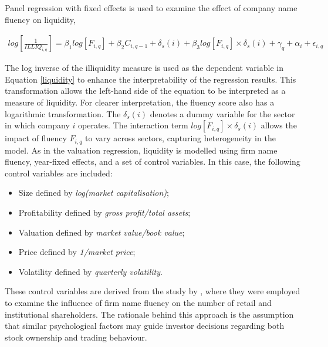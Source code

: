 \documentclass[a4paper,11pt]{report}
\begin{document}
Panel regression with fixed effects is used to examine the effect of company name fluency on liquidity,

\begin{align}
    log\left[\frac{1}{ILLIQ_{i,q}}\right] = \beta_1log\left[F_{i,q}\right] + {\beta_2}C_{i,q-1} + \delta_s(i) + {\beta_3}log\left[F_{i,q}\right] \times \delta_s(i) + \gamma_q + \alpha_i + \epsilon_{i,q}
\label{liquidity}
\end{align}

The log inverse of the illiquidity measure is used as the dependent variable in Equation \ref{liquidity} to enhance the interpretability of the regression results. This transformation allows the left-hand side of the equation to be interpreted as a measure of liquidity. For clearer interpretation, the fluency score also has a logarithmic transformation. The $\delta_s(i)$ denotes a dummy variable for the sector in which company $i$ operates. The interaction term $log\left[F_{i,q}\right] \times \delta_s(i)$ allows the impact of fluency $F_{i,q}$ to vary across sectors, capturing heterogeneity in the model. As in the valuation regression, liquidity is modelled using firm name fluency, year-fixed effects, and a set of control variables. In this case, the following control variables are included:

\begin{itemize}
    \item Size defined by \textit{log(market capitalisation)};
    \item Profitability defined by \textit{gross profit/total assets};
    \item Valuation defined by \textit{market value/book value};
    \item Price defined by \textit{1/market price};
    \item Volatility defined by \textit{quarterly volatility}.
\end{itemize}

These control variables are derived from the study by , where they were employed to examine the influence of firm name fluency on the number of retail and institutional shareholders. The rationale behind this approach is the assumption that similar psychological factors may guide investor decisions regarding both stock ownership and trading behaviour.
\end{document}
